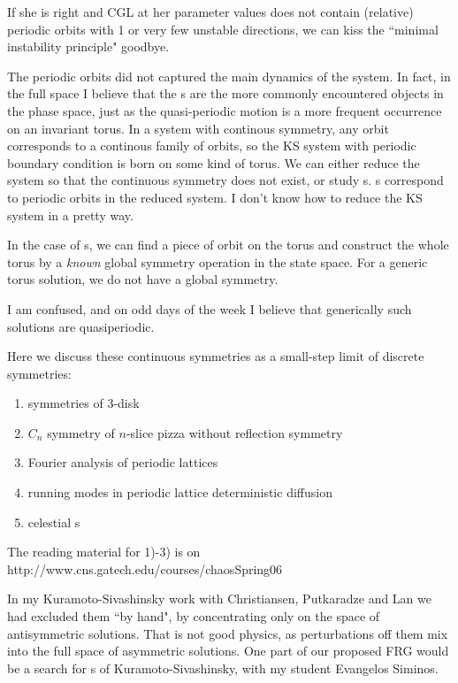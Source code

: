 If she is right and CGL at her parameter values does not contain
(relative) periodic orbits with 1 or very few unstable directions, we can
kiss the ``minimal instability principle" goodbye.

The 
periodic orbits
did not captured the main dynamics of the system. In fact, in the full
space I believe that the {\rpo s} are the more commonly
encountered objects in the phase space, just as the quasi-periodic motion is a
more frequent occurrence on an invariant torus. In a system with continous
symmetry, any orbit corresponds to a continous family of orbits, so the KS
system with periodic boundary condition is born on some kind of torus. We can
either reduce the system so that the continuous symmetry does not exist, or
study {\rpo s}. {\Rpo s} correspond to periodic
orbits in the reduced system. I don't know how to reduce the KS system in a
pretty way.

      In the case of {\rpo s}, we can find a piece of orbit on
the torus and construct the whole torus by a {\em known}
global symmetry operation in the
state space. For a generic torus solution, we do not have 
a global symmetry. 

        I am confused, and on odd days of the week I
 believe that generically such solutions are quasiperiodic.

        Here we discuss these continuous symmetries as
a small-step limit of discrete symmetries:

\begin{enumerate}
\item
        symmetries of 3-disk
\item
        $C_n$ symmetry of $n$-slice pizza without reflection symmetry
\item
        Fourier analysis of periodic lattices
\item
        running modes in periodic lattice deterministic
           diffusion
\item
	celestial {\rpo s}
\end{enumerate}

The reading material for 1)-3) is on
http://www.cns.gatech.edu/courses/chaosSpring06

In my Kuramoto-Sivashinsky work with Christiansen, Putkaradze and Lan we
had excluded them ``by hand", by concentrating only on the space of
antisymmetric solutions. That is not good physics, as perturbations off
them mix into the full space of asymmetric solutions. One part of our
proposed FRG would be a search for {\rpo s} of
Kuramoto-Sivashinsky, with my student Evangelos Siminos.


